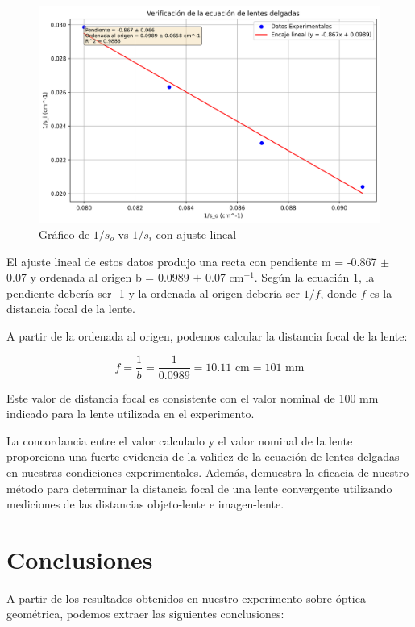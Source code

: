 \documentclass[twocolumn,a4paper,11pt]{scrartcl}
\begin{document}
\begin{figure}[h]
    \centering
    \includegraphics[width=0.8\linewidth]{lens_equation_verification.png}
    \caption{Gráfico de $1/s_o$ vs $1/s_i$ con ajuste lineal}
    \label{fig:graph}
\end{figure}

El ajuste lineal de estos datos produjo una recta con pendiente m = -0.867 $\pm$ 0.07 y ordenada al origen b = 0.0989 $\pm$ 0.07 cm$^{-1}$. Según la ecuación 1, la pendiente debería ser -1 y la ordenada al origen debería ser $1/f$, donde $f$ es la distancia focal de la lente.

A partir de la ordenada al origen, podemos calcular la distancia focal de la lente:

\begin{equation}
f = \frac{1}{b} = \frac{1}{0.0989} = 10.11 \text{ cm} = 101 \text{ mm}
\end{equation}

Este valor de distancia focal es consistente con el valor nominal de 100 mm indicado para la lente utilizada en el experimento.

La concordancia entre el valor calculado y el valor nominal de la lente proporciona una fuerte evidencia de la validez de la ecuación de lentes delgadas en nuestras condiciones experimentales. Además, demuestra la eficacia de nuestro método para determinar la distancia focal de una lente convergente utilizando mediciones de las distancias objeto-lente e imagen-lente.

\section{Conclusiones}

A partir de los resultados obtenidos en nuestro experimento sobre óptica geométrica, podemos extraer las siguientes conclusiones:
\end{document}

